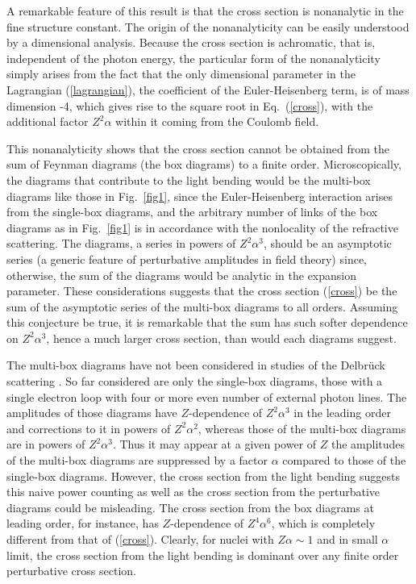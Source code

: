 \documentclass[aps,tightenlines,preprint]{revtex4-1}
\begin{document}
A remarkable feature of this result is that 
the cross section is nonanalytic in the fine structure constant. The origin of the nonanalyticity
can be easily understood by a dimensional analysis.  Because the cross section is achromatic,
that is, independent of the photon energy, 
the particular form of the
 nonanalyticity 
 simply arises from the fact that the only dimensional parameter 
 in the Lagrangian (\ref{lagrangian}), the coefficient of
 the Euler-Heisenberg  term, is of mass dimension -4, which gives
 rise to the square root in Eq.~(\ref{cross}),  with the additional factor
   $Z^{2}\alpha$ within it
    coming from the Coulomb field.

This nonanalyticity shows that
the cross section cannot be obtained from the sum of Feynman 
diagrams (the box diagrams) to a finite order. Microscopically,
 the diagrams that contribute 
to the light bending would be the
multi-box diagrams like those
in Fig.~\ref{fig1}, since the Euler-Heisenberg interaction arises
from the single-box diagrams, and the arbitrary number of links of the
box diagrams as in Fig.~\ref{fig1}
 is in accordance with the nonlocality of the refractive scattering.
 The diagrams, 
a series in  powers of $Z^{2}\alpha^{3}$, 
  should be an asymptotic series (a generic feature 
  of perturbative amplitudes in field theory) since,
 otherwise, the sum of the diagrams would
 be analytic in the expansion parameter.
 These considerations suggests
 that the cross section (\ref{cross}) be the
   sum of the asymptotic
series of the multi-box diagrams to all orders. 
Assuming this conjecture be true, 
 it is remarkable
that the sum has such softer dependence on $Z^{2}\alpha^{3}$, hence
a much larger cross section, than
would each diagrams suggest. 

The multi-box diagrams have not been 
  considered in
  studies of the Delbr{\"u}ck scattering
   \cite{cheng1,cheng2,
   cheng3,tollis,zhu,mork,koga}.
  So far considered are only the single-box diagrams, 
  those with a single electron loop with
   four or more  even number of external photon lines.
  The amplitudes of those  diagrams  have
  $Z$-dependence of $Z^{2}\alpha^{3}$ in the
  leading order  and
  corrections to it in powers of $Z^{2}\alpha^{2}$, whereas 
  those of the multi-box diagrams
  are in powers of $Z^{2}\alpha^{3}$. 
  Thus it may appear at a given power of $Z$ the amplitudes of
  the multi-box diagrams are suppressed 
  by a factor $\alpha$ compared to those of the
  single-box diagrams.
  However, the cross section from the light bending suggests 
  this naive power counting as well as 
  the cross section from  the perturbative diagrams
   could be misleading. 
   The cross section from the 
   box diagrams at leading order, for instance, 
   has $Z$-dependence of $Z^{4}\alpha^{6}$, 
   which is completely different
    from that of (\ref{cross}).  Clearly, for nuclei with
   $Z\alpha\sim 1$ and in small $\alpha$  limit, 
   the cross section   from the
   light bending is dominant over any finite 
   order perturbative cross section. 
  
\end{document}
